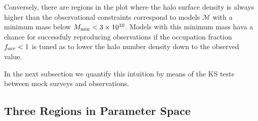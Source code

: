 \documentclass[usenatbib]{mn2e}
\newcommand{\hMsun}{{\ifmmode{h^{-1}{\rm {M_{\odot}}}}\else{$h^{-1}{\rm{M_{\odot}}}$}\fi}}
\begin{document}
Conversely, there are regions in the plot where the halo surface
density is always higher than the observational constraints correspond
to models ${\mathcal M}$ with a minimum mass below $M_{\rm min}<
3\times 10^{10}$\hMsun. Models with this minimum mass hava a chance
for successfuly reproducing observations if the occupation fraction
$f_{\rm occ}<1$ is tuned as to lower the halo number density down to
the observed value.    

In the next subsection we quantify this intuition by means of the KS
tests between mock surveys and observations.

\subsection{Three Regions in Parameter Space}
\end{document}
